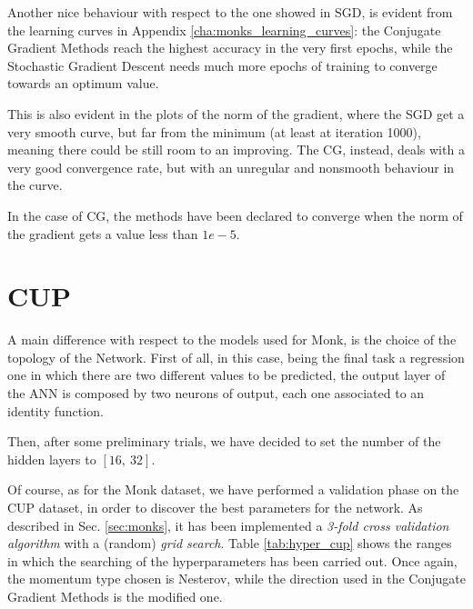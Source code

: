         Another nice behaviour with respect to the one showed in SGD, is evident from the learning curves in
        Appendix \ref{cha:monks_learning_curves}: the Conjugate Gradient Methods reach the highest accuracy in
        the very first epochs, while the Stochastic Gradient Descent needs much more epochs of training to converge
        towards an optimum value.

        This is also evident in the plots of the norm of the gradient, where the SGD get a very smooth curve, but far from the minimum (at least at iteration 1000), meaning there could be still room to an improving. The CG, instead, deals with a very good convergence rate, but with an unregular and nonsmooth behaviour in the curve.

        In the case of CG, the methods have been declared to converge when the norm of the gradient gets a value less than $1e-5$.


    \section{CUP} %
        \label{sec:cup}

        A main difference with respect to the models used for Monk, is the choice of the topology of the Network.
        First of all, in this case, being the final task a regression one in which there are two different values to be predicted, the output layer of the ANN is composed by two neurons of output, each one associated to an identity function.

        Then, after some preliminary trials, we have decided to set the number of the hidden layers to $[16,\ 32]$.

        Of course, as for the Monk dataset, we have performed a validation phase on the CUP dataset, in order to
        discover the best parameters for the network. As described in Sec. \ref{sec:monks}, it has been
        implemented a \textit{3-fold cross validation algorithm} with a (random) \textit{grid search}.
        Table \ref{tab:hyper_cup} shows the ranges in which the searching of the hyperparameters has been carried
        out. Once again, the momentum type chosen is Nesterov, while the direction used in the Conjugate Gradient
        Methods is the modified one.


